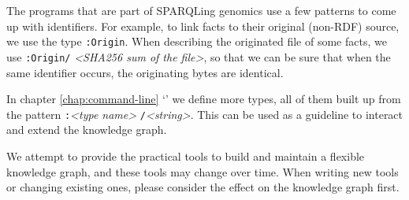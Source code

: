   The programs that are part of SPARQLing genomics use a few patterns to
  come up with identifiers.  For example, to link facts to their original
  (non-RDF) source, we use the type \texttt{:Origin}.  When describing the
  originated file of some facts, we use \texttt{:Origin/}%
  \emph{<SHA256 sum of the file>}, so that we can be sure that when the
  same identifier occurs, the originating bytes are identical.

  In chapter \ref{chap:command-line}
  {\color{LinkGray}`'} we define more types,
  all of them built up from the pattern \texttt{:}\emph{<type name>}%
  \texttt{/}\emph{<string>}.  This can be used as a guideline to interact
  and extend the knowledge graph.

  We attempt to provide the practical tools to build and maintain a flexible
  knowledge graph, and these tools may change over time.  When writing new
  tools or changing existing ones, please consider the effect on the knowledge
  graph first.
